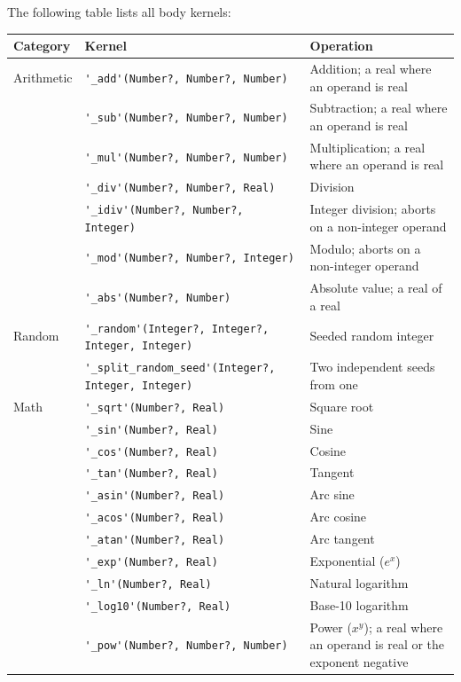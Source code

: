The following table lists all body kernels:

\begin{center}
{\footnotesize
\begin{tabular}{@{}l@{\hspace{4pt}}l@{\hspace{4pt}}p{}@{}}
\textbf{Category} & \textbf{Kernel} & \textbf{Operation} \\
\hline
Arithmetic & \verb|'_add'(Number?, Number?, Number)| & Addition; a real where an operand is real \\
 & \verb|'_sub'(Number?, Number?, Number)| & Subtraction; a real where an operand is real \\
 & \verb|'_mul'(Number?, Number?, Number)| & Multiplication; a real where an operand is real \\
 & \verb|'_div'(Number?, Number?, Real)| & Division \\
 & \verb|'_idiv'(Number?, Number?, Integer)| & Integer division; aborts on a non-integer operand \\
 & \verb|'_mod'(Number?, Number?, Integer)| & Modulo; aborts on a non-integer operand \\
 & \verb|'_abs'(Number?, Number)| & Absolute value; a real of a real \\
\hline
Random & \verb|'_random'(Integer?, Integer?, Integer, Integer)| & Seeded random integer \\
 & \verb|'_split_random_seed'(Integer?, Integer, Integer)| & Two independent seeds from one \\
\hline
Math & \verb|'_sqrt'(Number?, Real)| & Square root \\
 & \verb|'_sin'(Number?, Real)| & Sine \\
 & \verb|'_cos'(Number?, Real)| & Cosine \\
 & \verb|'_tan'(Number?, Real)| & Tangent \\
 & \verb|'_asin'(Number?, Real)| & Arc sine \\
 & \verb|'_acos'(Number?, Real)| & Arc cosine \\
 & \verb|'_atan'(Number?, Real)| & Arc tangent \\
 & \verb|'_exp'(Number?, Real)| & Exponential ($e^x$) \\
 & \verb|'_ln'(Number?, Real)| & Natural logarithm \\
 & \verb|'_log10'(Number?, Real)| & Base-10 logarithm \\
 & \verb|'_pow'(Number?, Number?, Number)| & Power ($x^y$); a real where an operand is real or the exponent negative \\

\end{tabular}}
\end{center}
